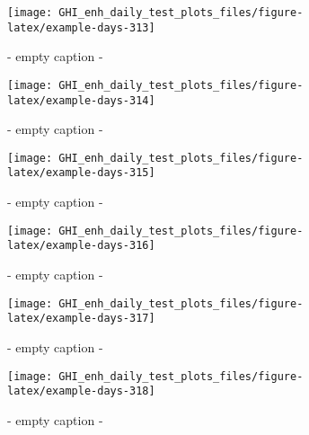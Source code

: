 \documentclass[
  10pt,
  a4paper,oneside]{article}
\begin{document}
\begin{figure}[H]

{\centering \texttt{[image: GHI\_enh\_daily\_test\_plots\_files/figure-latex/example-days-313]} 

}

\caption{ - empty caption - }\label{fig:example-days-313}
\end{figure}

\begin{figure}[H]

{\centering \texttt{[image: GHI\_enh\_daily\_test\_plots\_files/figure-latex/example-days-314]} 

}

\caption{ - empty caption - }\label{fig:example-days-314}
\end{figure}

\begin{figure}[H]

{\centering \texttt{[image: GHI\_enh\_daily\_test\_plots\_files/figure-latex/example-days-315]} 

}

\caption{ - empty caption - }\label{fig:example-days-315}
\end{figure}

\begin{figure}[H]

{\centering \texttt{[image: GHI\_enh\_daily\_test\_plots\_files/figure-latex/example-days-316]} 

}

\caption{ - empty caption - }\label{fig:example-days-316}
\end{figure}

\begin{figure}[H]

{\centering \texttt{[image: GHI\_enh\_daily\_test\_plots\_files/figure-latex/example-days-317]} 

}

\caption{ - empty caption - }\label{fig:example-days-317}
\end{figure}

\begin{figure}[H]

{\centering \texttt{[image: GHI\_enh\_daily\_test\_plots\_files/figure-latex/example-days-318]} 

}

\caption{ - empty caption - }\label{fig:example-days-318}
\end{figure}
\end{document}
